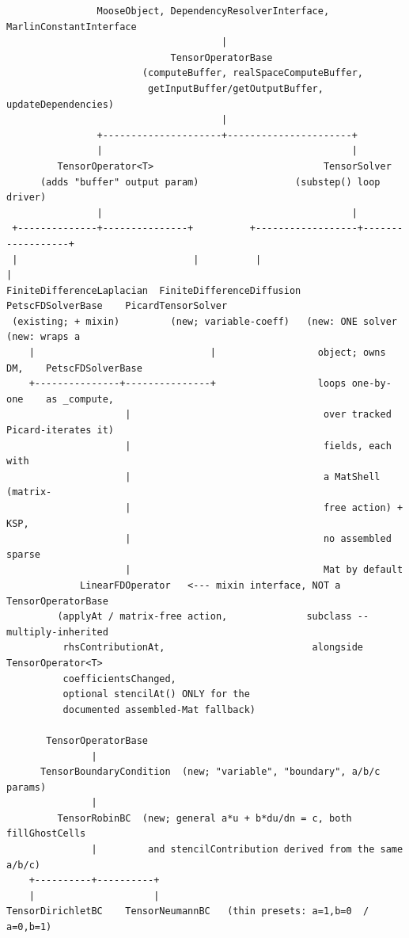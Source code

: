 \documentclass[11pt]{article}
\newenvironment{schematic}{%
  \begin{tcolorbox}[breakable, colback=codebg, colframe=gray!40, boxrule=0.4pt, arc=1mm, left=4mm, right=4mm, top=2mm, bottom=2mm]
  \ttfamily\footnotesize
}{%
  \end{tcolorbox}
}
\begin{document}
\begin{schematic}
\begin{verbatim}
                MooseObject, DependencyResolverInterface, MarlinConstantInterface
                                      |
                             TensorOperatorBase
                        (computeBuffer, realSpaceComputeBuffer,
                         getInputBuffer/getOutputBuffer, updateDependencies)
                                      |
                +---------------------+----------------------+
                |                                            |
         TensorOperator<T>                              TensorSolver
      (adds "buffer" output param)                 (substep() loop driver)
                |                                            |
 +--------------+---------------+          +------------------+------------------+
 |                               |          |                                     |
FiniteDifferenceLaplacian  FiniteDifferenceDiffusion  PetscFDSolverBase    PicardTensorSolver
 (existing; + mixin)         (new; variable-coeff)   (new: ONE solver       (new: wraps a
    |                               |                  object; owns DM,    PetscFDSolverBase
    +---------------+---------------+                  loops one-by-one    as _compute,
                     |                                  over tracked       Picard-iterates it)
                     |                                  fields, each with
                     |                                  a MatShell (matrix-
                     |                                  free action) + KSP,
                     |                                  no assembled sparse
                     |                                  Mat by default
             LinearFDOperator   <--- mixin interface, NOT a TensorOperatorBase
         (applyAt / matrix-free action,              subclass -- multiply-inherited
          rhsContributionAt,                          alongside TensorOperator<T>
          coefficientsChanged,
          optional stencilAt() ONLY for the
          documented assembled-Mat fallback)

       TensorOperatorBase
               |
      TensorBoundaryCondition  (new; "variable", "boundary", a/b/c params)
               |
         TensorRobinBC  (new; general a*u + b*du/dn = c, both fillGhostCells
               |         and stencilContribution derived from the same a/b/c)
    +----------+----------+
    |                     |
TensorDirichletBC    TensorNeumannBC   (thin presets: a=1,b=0  /  a=0,b=1)
\end{verbatim}
\end{schematic}
\end{document}
